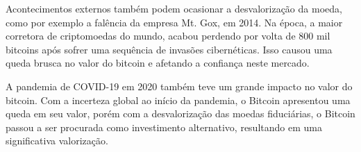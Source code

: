 Acontecimentos externos também podem ocasionar a desvalorização da moeda, como por exemplo a falência da empresa Mt. Gox, em 2014. Na época, a maior corretora de criptomoedas do mundo, acabou perdendo por volta de 800 mil bitcoins após sofrer uma sequência de invasões cibernéticas. Isso causou uma queda brusca no valor do bitcoin e afetando a confiança neste mercado.

A pandemia de COVID-19 em 2020 também teve um grande impacto no valor do bitcoin. Com a incerteza global ao início da pandemia, o Bitcoin apresentou uma queda em seu valor, porém com a desvalorização das moedas fiduciárias, o Bitcoin passou a ser procurada como investimento alternativo, resultando em uma significativa valorização.
